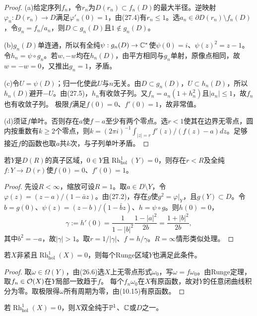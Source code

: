 \begin{proof}
(a)给定序列$f_n$，令$r_n$为$D(r_n)\subset f_n(D)$的最大半径。逆映射$\varphi_n:D(r_n)\to D$满足$\varphi'_n(0)=1$，由(27.4)有$r_n\le1$。选$a_n\in\partial D(r_n)\setminus f_n(D)$，令$g_n=f_n/a_n$，则$D\subset g_n(D)$且$1\notin g_n(D)$。

(b)$g_n(D)$单连通，所以有全纯$\psi:g_n(D)\to\mathbb C^*$使$\psi(0)=i$、$\psi(z)^2=z-1$。令$h_n=\psi\circ g_n$。若$w,-w$均在$h_n(D)$，由平方相同与$g_n$单射，原像点相同，故$w=-w=0$，又推出$g_n=1$，矛盾。

(c)令$U=\psi(D)$；归一化使此$U$与$n$无关。由$D\subset g_n(D)$，$U\subset h_n(D)$，所以$h_n(D)$避开$-U$。由(27.5)，$h_n$有收敛子列。又$f_n=a_n(1+h_n^2)$且$|a_n|\le1$，故$f_n$也有收敛子列。
极限$f$满足$f(0)=0$、$f'(0)=1$，故非常值。

(d)须证$f$单叶。否则存在$a$使$f-a$至少有两个零点。选$r<1$使其在边界无零点，圆内按重数有$k\ge2$个零点，则$k=(2\pi i)^{-1}\int_{|z|=r}f'(z)/(f(z)-a)dz$。足够接近$f$的函数也取$a$共$k$次，与子列单叶矛盾。
\end{proof}
若$Y$是$D(R)$的真子区域，$0\in Y$且$\operatorname{Rh}_{\mathrm{hol}}^1(Y)=0$，则存在$r<R$及全纯$f:Y\to D(r)$使$f(0)=0$、$f'(0)=1$。
\begin{proof}
先设$R<\infty$，缩放可设$R=1$。取$a\in D\setminus Y$，令$\varphi(z)=(z-a)/(1-\bar az)$。由(27.2)，存在$g$使$g^2=\varphi|_Y$，且$g(Y)\subset D$。令$b=g(0)$、$\psi(z)=(z-b)/(1-\bar bz)$、$h=\psi\circ g$。则$h(0)=0$，
\[
\gamma:=h'(0)=\frac1{1-|b|^2}\frac{1-|a|^2}{2b}=\frac{1+|b|^2}{2b},
\]
其中$b^2=-a$，故$|\gamma|>1$。取$r=1/|\gamma|$、$f=h/\gamma$。$R=\infty$情形类似处理。
\end{proof}
若$X$非紧且$\operatorname{Rh}_{\mathrm{hol}}^1(X)=0$，则每个Runge区域$Y$也满足此条件。
\begin{proof}
取$\omega\in\Omega(Y)$，由(26.6)选$X$上无零点形式$\omega_0$，写$\omega=f\omega_0$。由Runge定理，取$f_n\in\mathcal O(X)$在$Y$局部一致趋于$f$。
每个$f_n\omega_0$在$X$有原函数，故对$Y$的任意闭曲线积分为零。取极限得$\omega$所有周期为零，由(10.15)有原函数。
\end{proof}
若$\operatorname{Rh}_{\mathrm{hol}}^1(X)=0$，则$X$双全纯于$\mathbb P^1$、$\mathbb C$或$D$之一。

